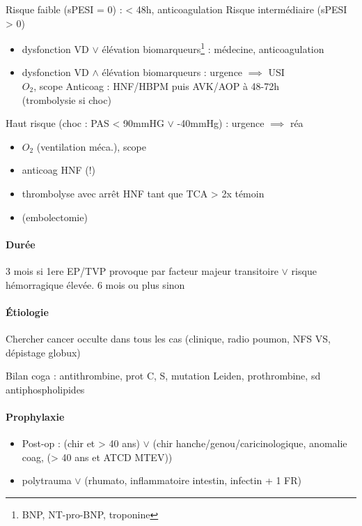 Risque faible (sPESI = 0) : \faHospitalO{} < 48h, anticoagulation
Risque intermédiaire (sPESI > 0)
\begin{itemize}
  \item dysfonction VD $\vee$ élévation biomarqueurs\footnote{BNP, NT-pro-BNP,
      troponine} : \faHospitalO{}
    médecine, anticoagulation
  \item dysfonction VD $\wedge$ élévation biomarqueurs : urgence \danger{}
    $\implies$ USI\\
    $O_2$, scope
    Anticoag : HNF/HBPM puis AVK/AOP à 48-72h\\
    (trombolysie si choc)
\end{itemize}
Haut risque (choc : PAS < 90mmHG $\vee$ -40mmHg) : urgence \skull $\implies$ réa
\begin{itemize}
  \item $O_2$ (ventilation méca.), scope
  \item anticoag HNF (!)
  \item thrombolyse avec arrêt HNF tant que TCA > 2x témoin
  \item (embolectomie)
\end{itemize}

\paragraph{Durée}
3 mois si 1ere EP/TVP provoque par facteur majeur transitoire $\vee$ risque
hémorragique élevée. 6 mois ou plus sinon

\paragraph{Étiologie}
Chercher cancer occulte dans tous les cas (clinique, radio poumon, NFS VS,
dépistage globux)

Bilan coga : {antithrombine, prot C, S}, mutation {Leiden, prothrombine}, sd
antiphospholipides

\paragraph{Prophylaxie}
\begin{itemize}
  \item Post-op : (chir et > 40 ans) $\vee$ (chir hanche/genou/caricinologique, anomalie
coag, (> 40 ans et ATCD MTEV))
  \item polytrauma $\vee$ ({rhumato, inflammatoire intestin, infectin} + 1 FR)

\end{itemize}




